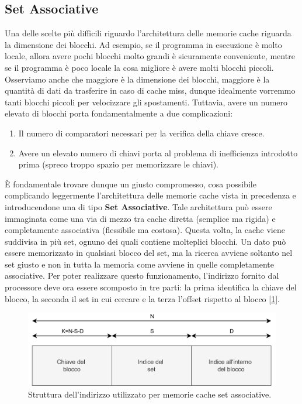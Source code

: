 \subsection{Set Associative}
Una delle scelte più difficili riguardo l'architettura delle memorie cache riguarda la dimensione dei blocchi. Ad esempio, se il programma in esecuzione è molto locale, allora avere pochi blocchi molto grandi è sicuramente conveniente, mentre se il programma è poco locale la cosa migliore è avere molti blocchi piccoli. Osserviamo anche che maggiore è la dimensione dei blocchi, maggiore è la quantità di dati da trasferire in caso di cache miss, dunque idealmente vorremmo tanti blocchi piccoli per velocizzare gli spostamenti. Tuttavia, avere un numero elevato di blocchi porta fondamentalmente a due complicazioni:
\begin{enumerate}
    \item Il numero di comparatori necessari per la verifica della chiave cresce.
    \item Avere un elevato numero di chiavi porta al problema di inefficienza introdotto prima (spreco troppo spazio per memorizzare le chiavi).
\end{enumerate}

\MakeUppercase{è} fondamentale trovare dunque un giusto compromesso, cosa possibile complicando leggermente l'architettura delle memorie cache vista in precedenza e introducendone una di tipo \textbf{Set Associative}. Tale architettura può essere immaginata come una via di mezzo tra cache diretta (semplice ma rigida) e completamente associativa (flessibile ma costosa). Questa volta, la cache viene suddivisa in più set, ognuno dei quali contiene molteplici blocchi. Un dato può essere memorizzato in qualsiasi blocco del set, ma la ricerca avviene soltanto nel set giusto e non in tutta la memoria come avviene in quelle completamente associative. Per poter realizzare questo funzionamento, l'indirizzo fornito dal processore deve ora essere scomposto in tre parti: la prima identifica la chiave del blocco, la seconda il set in cui cercare e la terza l'offset rispetto al blocco [\ref{fig:indirizzo-setass}]. 

\begin{figure}[!h]
    \centering
    \includegraphics[width=0.6\linewidth]{img/indirizzo-setass.png}
    \caption{Struttura dell'indirizzo utilizzato per memorie cache set associative.}
    \label{fig:indirizzo-setass}
\end{figure}

